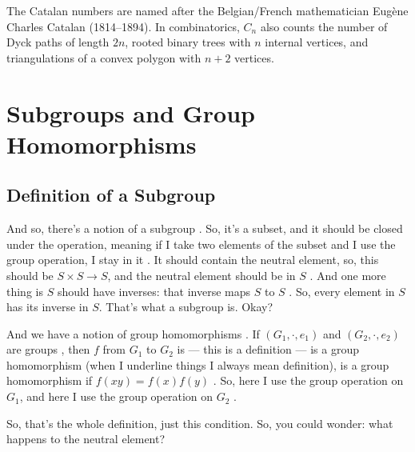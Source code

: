 \begin{aiNote}
The Catalan numbers are named after the Belgian/French mathematician Eugène Charles Catalan (1814--1894). In combinatorics, $C_n$ also counts the number of Dyck paths of length $2n$, rooted binary trees with $n$ internal vertices, and triangulations of a convex polygon with $n+2$ vertices.
\end{aiNote}

\begin{hidden}
\end{hidden}

\section{Subgroups and Group Homomorphisms}

\subsection{Definition of a Subgroup}

\begin{speech}[00:57:49 - 00:59:44]
And so, there's a notion of a subgroup . So, it's a subset, and it should be closed under the operation, meaning if I take two elements of the subset and I use the group operation, I stay in it . It should contain the neutral element, so, this should be $S \times S \to S$, and the neutral element should be in $S$ . And one more thing is $S$ should have inverses: that inverse maps $S$ to $S$ . So, every element in $S$ has its inverse in $S$. That's what a subgroup is. Okay?

And we have a notion of group homomorphisms . If $(G_1, \cdot, e_1)$ and $(G_2, \cdot, e_2)$ are groups , then $f$ from $G_1$ to $G_2$  is --- this is a definition --- is a group homomorphism  (when I underline things I always mean definition), is a group homomorphism if $f(xy) = f(x) f(y)$ . So, here I use the group operation on $G_1$, and here I use the group operation on $G_2$ .

So, that's the whole definition, just this condition. So, you could wonder: what happens to the neutral element?
\end{speech}

